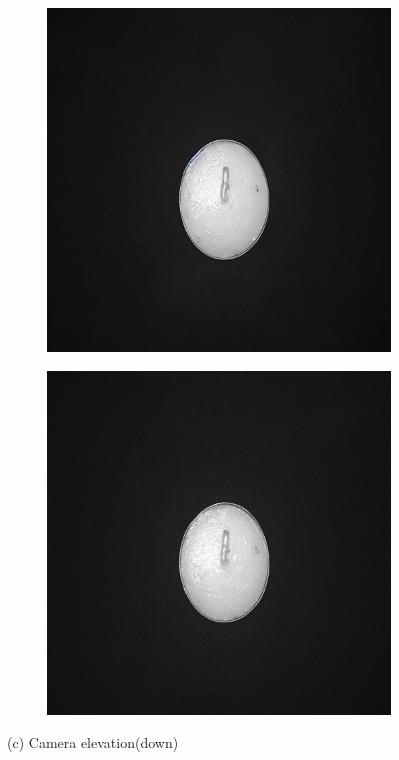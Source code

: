 \documentclass[12pt,DIV14,BCOR12mm,a4paper,footinclude=false,headinclude,parskip=half-,twoside,openright,cleardoublepage=empty,toc=index,bibliography=totoc,listof=totoc]{scrreprt}
\numberwithin{equation}{chapter}
\begin{document}
\begin{figure}
    \vspace{0.3cm} %

    \begin{subfigure}[t]{0.24\textwidth}
        \centering
        \includegraphics[width=\textwidth]{../media/diff_candles_down_real.png}
    \end{subfigure}%
    \hspace{0.02\textwidth}
    \begin{subfigure}[t]{0.24\textwidth}
        \centering
        \includegraphics[width=\textwidth]{../media/diff_candles_down_fake.png}
    \end{subfigure}
    \caption*{(c) Camera elevation(down)}


\end{figure}
\end{document}

